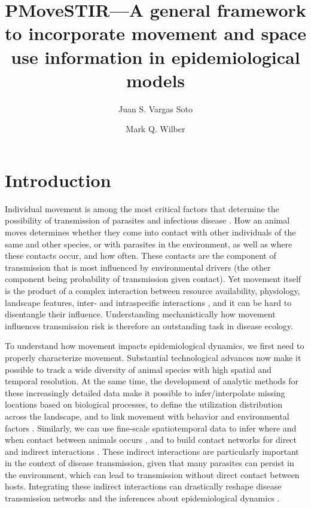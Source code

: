 \documentclass[letterpaper]{article}
\title{PMoveSTIR---A general framework to incorporate movement and space use information in epidemiological models}
\author{Juan S. Vargas Soto \and Mark Q. Wilber}
\affil{School of Natural Resources, University of Tennessee, Knoxville, TN}
\date{}
\begin{document}
\maketitle

\linenumbers
\doublespacing

\section*{Introduction}

Individual movement is among the most critical factors that determine the possibility of transmission of parasites and infectious disease \citep{Manlove2022,Dougherty2022}. How an animal moves determines whether they come into contact with other individuals of the same and other species, or with parasites in the environment, as well as where these contacts occur, and how often. These contacts are the component of transmission that is most influenced by environmental drivers (the other component being probability of transmission given contact). Yet movement itself is the product of a complex interaction between resource availability, physiology, landscape features, inter- and intraspecific interactions \citep{Nathan2008}, and it can be hard to disentangle their influence. Understanding mechanistically how movement influences transmission risk is therefore an outstanding task in disease ecology. %

To understand how movement impacts epidemiological dynamics, we first need to properly characterize movement. Substantial technological advances now make it possible to track a wide diversity of animal species with high spatial and temporal resolution. At the same time, the development of analytic methods for these increasingly detailed data make it possible to infer/interpolate missing locations based on biological processes, to define the utilization distribution across the landscape, and to link movement with behavior and environmental factors \citep{Signer2017,Hooten2017,Avgar2016}. Similarly, we can use fine-scale spatiotemporal data to infer where and when contact between animals occurs \citep{Noonan2021}, and to build contact networks for direct \citep{Craft2015} and indirect interactions \citep{Yang2023}. These indirect interactions are particularly important in the context of disease transmission, given that many parasites can persist in the environment, which can lead to transmission without direct contact between hosts. Integrating these indirect interactions can drastically reshape disease transmission networks and the inferences about epidemiological dynamics \citep{Wilber2022,Richardson2015}. 
\end{document}
